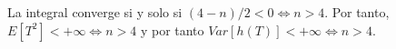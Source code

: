 \documentclass[12pt]{article}
\begin{document}
\begin{ejercicio}[2.5 puntos]
\begin{enumerate}[label=\alph*)]
            La integral converge si y solo si $(4-n)/2 < 0 \iff n > 4$. Por tanto, $E[T^2] < +\infty \iff n > 4$ y por tanto $Var[h(T)] < +\infty \iff n > 4$.

\end{enumerate}
\end{ejercicio}
\end{document}
